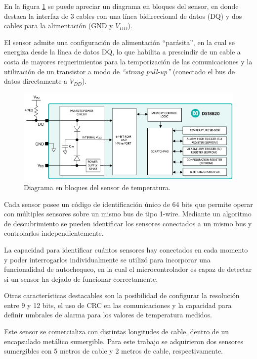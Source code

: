En la figura \ref{fig:ds18b20_bloques} se puede apreciar un diagrama en bloques del sensor, en donde destaca la interfaz de 3 cables con una línea bidireccional de datos (DQ) y dos cables para la alimentación (GND y $V_{DD}$).

El sensor admite una configuración de alimentación ``parásita'', en la cual se energiza desde la línea de datos DQ, lo que habilita a prescindir de un cable a costa de mayores requerimientos para la temporización de las comunicaciones y la utilización de un transistor a modo de \textit{``strong pull-up''} (conectado el bus de datos directamente a $V_{DD}$).

\begin{figure}[htpb]
	\centering
	\includegraphics[width=.8\textwidth]{./Figures/ds18b20_bloques.png}
	\caption[Diagrama en bloques del sensor de temperatura DS18B20]{Diagrama en bloques del sensor de temperatura\protect\footnotemark.}
	\label{fig:ds18b20_bloques}
\end{figure}


Cada sensor posee un código de identificación único de 64 bits que permite operar con múltiples sensores sobre un mismo bus de tipo 1-wire.  Mediante un algoritmo de descubrimiento se pueden identificar los sensores conectados a un mismo bus y controlarlos independientemente.

La capacidad para identificar cuántos sensores hay conectados en cada momento y poder interrogarlos individualmente se utilizó para incorporar una funcionalidad de autochequeo, en la cual el microcontrolador es capaz de detectar si un sensor ha dejado de funcionar correctamente.

Otras características destacables son la posibilidad de configurar la resolución entre 9 y 12 bits, el uso de CRC en las comunicaciones y la capacidad para definir umbrales de alarma para los valores de temperatura medidos.

Este sensor se comercializa con distintas longitudes de cable, dentro de un encapsulado metálico sumergible.  Para este trabajo se adquirieron dos sensores sumergibles con 5 metros de cable y 2 metros de cable, respectivamente.

